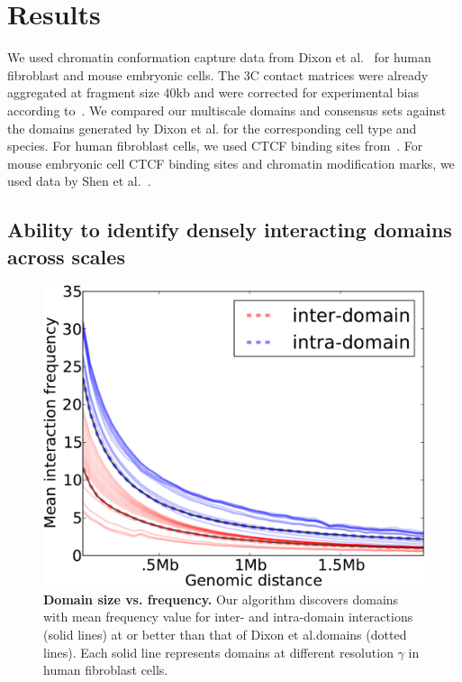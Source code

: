 \documentclass[12pt]{cmuthesis}
\begin{document}
%
%
\section{Results}

  We used chromatin conformation capture data from Dixon et al.~\cite{Dixon2012} for human fibroblast and mouse embryonic cells. The 3C contact matrices were already aggregated at fragment size 40kb and were corrected for experimental bias according to~\cite{Yaffe2011}. We compared our multiscale domains and consensus sets against the domains generated by Dixon et al. for the corresponding cell type and species.
  For human fibroblast cells, we used CTCF binding sites from~\cite{Kim2007}.
  For mouse embryonic cell CTCF binding sites and chromatin modification marks, we used data by Shen et al.~\cite{Shen2012}.


  \subsection{Ability to identify densely interacting domains across scales}

  

  \begin{figure}[ht!]
      \centering
      \includegraphics[width=0.6\linewidth]{figures/imr90-inter-intra-all-chromos}
      \caption{\textbf{Domain size vs. frequency.} Our algorithm discovers domains with mean frequency value for inter- and intra-domain interactions (solid lines) at or better than that of Dixon et al.\@ domains (dotted lines). Each solid line represents domains at different resolution $\gamma$ in human fibroblast cells.}
      \label{fig:armatus:size-freq}
  \end{figure}
\end{document}
